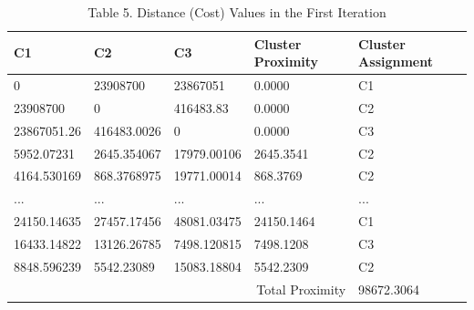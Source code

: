 \documentclass[conference]{IEEEtran}
\begin{document}
\begin{table}[h]
    \centering
    \begin{tabularx}{\linewidth}{|X|X|X|X|X|}
    \hline
    C1 & C2 & C3 & Cluster Proximity & Cluster Assignment \\
    \hline
    0 & 23908700 & 23867051 & 0.0000 & C1 \\ \hline
    23908700 & 0 & 416483.83 & 0.0000 & C2 \\ \hline
    23867051.26 & 416483.0026 & 0 & 0.0000 & C3 \\ \hline
    5952.07231 & 2645.354067 & 17979.00106 & 2645.3541 & C2 \\ \hline
    4164.530169 & 868.3768975 & 19771.00014 & 868.3769 & C2 \\ \hline
    ... & ... & ... & ... & ... \\ \hline
    24150.14635 & 27457.17456 & 48081.03475 & 24150.1464 & C1 \\ \hline
    16433.14822 & 13126.26785 & 7498.120815 & 7498.1208 & C3 \\ \hline
    8848.596239 & 5542.23089 & 15083.18804 & 5542.2309 & C2 \\
    \hline
    \multicolumn{4}{|r|}{Total Proximity} & 98672.3064 \\
    \hline
    \end{tabularx}
    \caption{Table 5. Distance (Cost) Values in the First Iteration}
    \label{tab:distance_values}
\end{table}
\end{document}
